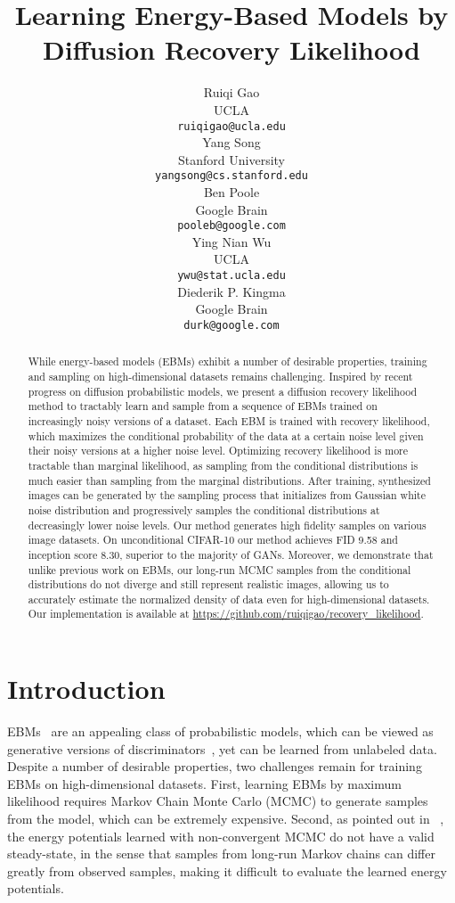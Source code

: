 \documentclass{article} \usepackage{iclr2021_conference,times}
\title{Learning Energy-Based Models by Diffusion Recovery Likelihood}
\author{
 Ruiqi Gao \\
 UCLA\\
 \texttt{ruiqigao@ucla.edu} \\
 \And
 Yang Song \\
 Stanford University \\
 \texttt{yangsong@cs.stanford.edu} \\
 \And
 Ben Poole \\
 Google Brain \\
 \texttt{pooleb@google.com} \\
 \AND
 Ying Nian Wu\\ 
 UCLA \\
\texttt{ywu@stat.ucla.edu} \\
 \And
  Diederik P. Kingma\\
 Google Brain \\
 \texttt{durk@google.com}
}
\begin{document}
\maketitle

\begin{abstract}
While energy-based models (EBMs) exhibit a number of desirable properties, training and sampling on high-dimensional datasets remains challenging. Inspired by recent progress on diffusion probabilistic models, we present a diffusion recovery likelihood method to tractably learn and sample from a sequence of EBMs trained on increasingly noisy versions of a dataset. Each EBM is trained with recovery likelihood,  which maximizes the conditional probability of the data at a certain noise level given their noisy versions at a higher noise level. Optimizing recovery likelihood is more tractable than marginal likelihood, as sampling from the conditional distributions is much easier than sampling from the marginal distributions. After training, synthesized images can be generated by the sampling process that initializes from Gaussian white noise distribution and progressively samples the conditional distributions at decreasingly lower noise levels.  Our method generates high fidelity samples on various image datasets. On unconditional CIFAR-10 our method achieves FID 9.58 and inception score 8.30, superior to the majority of GANs. Moreover, we demonstrate that unlike previous work on EBMs, our long-run MCMC samples from the conditional distributions do not diverge and still represent realistic images, allowing us to accurately estimate the normalized density of data even for high-dimensional datasets. Our implementation is available at \url{https://github.com/ruiqigao/recovery_likelihood}.
\end{abstract}

\section{Introduction}

EBMs~\citep{lecun2006tutorial,ngiam2011learning,kim2016deep,zhao2016energy,goyal2017variational,xie2016theory,finn2016connection,gao2018learning,kumar2019maximum,nijkamp2019learning,du2019implicit,grathwohl2019your,desjardins2011tracking,gao2020flow,che2020your,grathwohl2020cutting,qiu2019unbiased,rhodes2020telescoping} are an appealing class of probabilistic models, which can be viewed as generative versions of  discriminators~\citep{jin2017introspective, lazarow2017introspective, lee2018wasserstein, grathwohl2020cutting}, yet can be learned from unlabeled data. Despite a number of desirable properties, two challenges remain for training EBMs on high-dimensional datasets. First, learning EBMs by maximum likelihood requires Markov Chain Monte Carlo (MCMC) to generate samples from the model, which can be extremely expensive. Second, as pointed out in ~\citet{nijkamp2019anatomy}, the energy potentials learned with non-convergent MCMC do not have a valid steady-state, in the sense that samples from long-run Markov chains can differ greatly from observed samples, making it difficult to evaluate the learned energy potentials.
\end{document}
